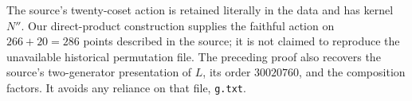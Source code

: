 The source's twenty-coset action is retained literally in the data and has kernel $N''$. Our direct-product construction supplies the faithful action on $266+20=286$ points described in the source; it is not claimed to reproduce the unavailable historical permutation file. The preceding proof also recovers the source's two-generator presentation of $L$, its order $30020760$, and the composition factors. It avoids any reliance on that file, \texttt{g.txt}.

